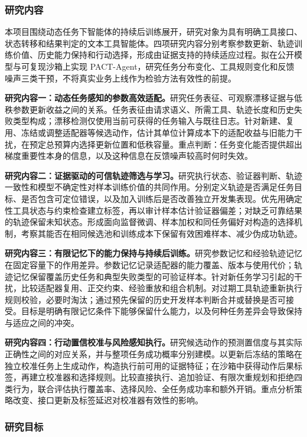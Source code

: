 \justifying
\NSFCBodyText

\subsubsection{研究内容}

本项目围绕动态任务下智能体的持续后训练展开，研究对象为具有明确工具接口、状态转移和结果判定的文本工具智能体。四项研究内容分别考察参数更新、轨迹训练价值、历史能力保持和行动选择，形成由证据支持的持续适应过程。拟在公开模型与可复现沙箱上实现 PACT-Agent，研究任务分布变化、工具规则变化和反馈噪声三类干预，不将真实业务上线作为检验方法有效性的前提。

\textbf{研究内容一：动态任务感知的参数高效适配。}研究任务表征、可观察漂移证据与低秩参数更新收益之间的关系。任务表征由请求语义、所需工具、轨迹长度和历史失败类型构成；漂移检测仅使用当前可获得的任务输入与既往日志。针对新建、复用、冻结或调整适配器等候选动作，估计其单位计算成本下的适配收益与旧能力干扰，在预定总预算内选择更新位置和低秩容量。重点判断：任务变化能否提供超出梯度重要性本身的信息，以及这种信息在反馈噪声较高时何时失效。

\textbf{研究内容二：证据驱动的可信轨迹筛选与学习。}研究执行状态、验证器判断、轨迹一致性和模型不确定性对样本训练价值的共同作用。分别定义轨迹是否满足任务目标、是否包含可定位错误，以及加入训练后是否改善独立开发集表现。优先用确定性工具状态与约束检查建立标签，再以审计样本估计验证器偏差；对缺乏可靠结果的轨迹保留未知状态。形成面向监督微调、样本加权和同任务偏好对构造的选择机制，考察其能否在相同候选池和训练成本下保留有效困难样本、减少伪成功轨迹。

\textbf{研究内容三：有限记忆下的能力保持与持续后训练。}研究参数记忆和经验轨迹记忆在固定容量下的作用差异。参数记忆记录适配器的能力覆盖、版本与使用代价；轨迹记忆保留覆盖历史任务和典型失败类型的可验证样本。针对新任务学习引起的干扰，比较适配器复用、正交约束、经验重放和组合机制。对过期工具轨迹重新执行规则校验，必要时淘汰；通过预先保留的历史开发样本判断合并或替换是否可接受。目标是明确有限记忆条件下能够保留什么能力，以及何种任务差异会导致保持与适应之间的冲突。

\textbf{研究内容四：行动置信校准与风险感知执行。}研究候选动作的预测置信度与其实际正确性之间的对应关系，并与整项任务成功概率分别建模。以更新后冻结的策略在独立校准任务上生成动作，构造执行前可用的证据特征；在沙箱中获得动作后果标签，再建立校准器和选择规则。比较直接执行、追加验证、有限次重规划和拒绝四类行为，联合评估执行覆盖率、选择风险、全任务成功率和额外开销。重点分析策略改变、接口更新及标签延迟对校准器有效性的影响。

\subsubsection{研究目标}

